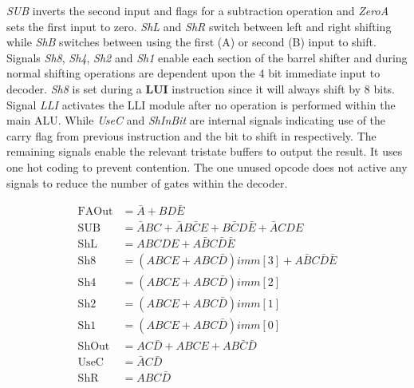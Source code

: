 \textit{SUB} inverts the second input and flags for a subtraction operation and \textit{ZeroA} sets the first input to zero. 
\textit{ShL} and \textit{ShR} switch between left and right shifting while \textit{ShB} switches between using the first (A) or second (B) input to shift. 
Signals \textit{Sh8}, \textit{Sh4}, \textit{Sh2} and \textit{Sh1} enable each section of the barrel shifter and during normal shifting operations are dependent upon the 4 bit immediate input to decoder. 
\textit{Sh8} is set during a \textbf{LUI} instruction since it will always shift by 8 bits. 
Signal \textit{LLI} activates the LLI module after no operation is performed within the main ALU. 
While \textit{UseC} and \textit{ShInBit} are internal signals indicating use of the carry flag from previous instruction and the bit to shift in respectively. 
The remaining signals enable the relevant tristate buffers to output the result. It uses one hot coding to prevent contention. 
The one unused opcode does not active any signals to reduce the number of gates within the decoder. 

\begin{align}
	\text{FAOut} &= \bar{A} + BD\bar{E} \label{eq:DecBasicS}\\
	\text{SUB} &= \bar{A}BC + \bar{A}B\bar{C}E + B\bar{C}D\bar{E} + \bar{A}CDE \\
	\text{ShL} &= ABCDE + A\bar{B}C\bar{D}\bar{E} \\
	\text{Sh8} &= (ABCE + ABC\bar{D})imm[3] + A\bar{B}C\bar{D}\bar{E} \\
	\text{Sh4} &= (ABCE + ABC\bar{D})imm[2] \\
	\text{Sh2} &= (ABCE + ABC\bar{D})imm[1] \\
	\text{Sh1} &= (ABCE + ABC\bar{D})imm[0] \\
	\text{ShOut} &= AC\bar{D} + ABCE + AB\bar{C}\bar{D} \\
	\text{UseC} &= \bar{A}C\bar{D} \\
	\text{ShR} &= ABC\bar{D} \label{eq:DecBasicF}
\end{align}


